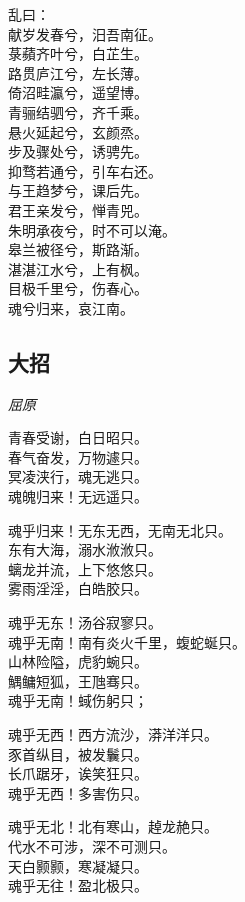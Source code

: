 \documentclass[]{article}
\begin{document}
乱曰：\\
献岁发春兮，汨吾南征。\\
菉蘋齐叶兮，白芷生。\\
路贯庐江兮，左长薄。\\
倚沼畦瀛兮，遥望博。\\
青骊结驷兮，齐千乘。\\
悬火延起兮，玄颜烝。\\
步及骤处兮，诱骋先。\\
抑骛若通兮，引车右还。\\
与王趋梦兮，课后先。\\
君王亲发兮，惮青兕。\\
朱明承夜兮，时不可以淹。\\
皋兰被径兮，斯路渐。\\
湛湛江水兮，上有枫。\\
目极千里兮，伤春心。\\
魂兮归来，哀江南。

\hypertarget{header-n2940}{%
\subsection{大招}\label{header-n2940}}

\emph{屈原}

青春受谢，白日昭只。\\
春气奋发，万物遽只。\\
冥凌浃行，魂无逃只。\\
魂魄归来！无远遥只。

魂乎归来！无东无西，无南无北只。\\
东有大海，溺水浟浟只。\\
螭龙并流，上下悠悠只。\\
雾雨淫淫，白皓胶只。

魂乎无东！汤谷寂寥只。\\
魂乎无南！南有炎火千里，蝮蛇蜒只。\\
山林险隘，虎豹蜿只。\\
鰅鳙短狐，王虺骞只。\\
魂乎无南！蜮伤躬只；

魂乎无西！西方流沙，漭洋洋只。\\
豕首纵目，被发鬤只。\\
长爪踞牙，诶笑狂只。\\
魂乎无西！多害伤只。

魂乎无北！北有寒山，趠龙赩只。\\
代水不可涉，深不可测只。\\
天白颢颢，寒凝凝只。\\
魂乎无往！盈北极只。
\end{document}
